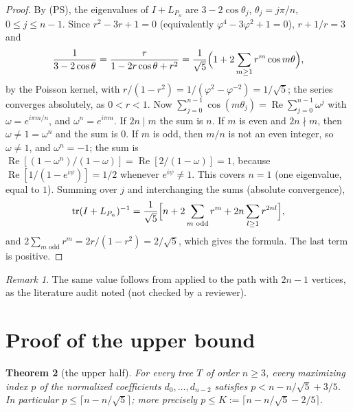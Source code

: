 \documentclass[11pt]{amsart}
\newtheorem{theorem}{Theorem}[section]
\theoremstyle{definition}
\theoremstyle{remark}
\newtheorem{remark}[theorem]{Remark}
\newcommand{\tr}{\operatorname{tr}}
\begin{document}
\begin{proof}
By (PS), the eigenvalues of $I+L_{P_n}$ are $3-2\cos\theta_j$,
$\theta_j=j\pi/n$, $0\le j\le n-1$. Since $r^2-3r+1=0$ (equivalently
$\varphi^4-3\varphi^2+1=0$), $r+1/r=3$ and
\[
\frac1{3-2\cos\theta}=\frac{r}{1-2r\cos\theta+r^2}
=\frac1{\sqrt5}\Bigl(1+2\sum_{m\ge1}r^m\cos m\theta\Bigr),
\]
by the Poisson kernel, with $r/(1-r^2)=1/(\varphi^2-\varphi^{-2})=1/\sqrt5$;
the series converges absolutely, as $0<r<1$. Now
$\sum_{j=0}^{n-1}\cos(m\theta_j)=\operatorname{Re}\sum_{j=0}^{n-1}\omega^j$ with
$\omega=e^{i\pi m/n}$, and $\omega^n=e^{i\pi m}$. If $2n\mid m$ the sum is $n$.
If $m$ is even and $2n\nmid m$, then $\omega\ne1=\omega^n$ and the sum is $0$.
If $m$ is odd, then $m/n$ is not an even integer, so $\omega\ne1$, and
$\omega^n=-1$; the sum is
$\operatorname{Re}[(1-\omega^n)/(1-\omega)]=\operatorname{Re}[2/(1-\omega)]=1$,
because $\operatorname{Re}[1/(1-e^{i\psi})]=1/2$ whenever $e^{i\psi}\ne1$.
This covers $n=1$ (one eigenvalue, equal to $1$). Summing over $j$ and
interchanging the sums (absolute convergence),
\[
\tr(I+L_{P_n})^{-1}=\frac1{\sqrt5}\Bigl[n+2\sum_{m\text{ odd}}r^m+2n\sum_{l\ge1}r^{2nl}\Bigr],
\]
and $2\sum_{m\text{ odd}}r^m=2r/(1-r^2)=2/\sqrt5$, which gives the formula.
The last term is positive.
\end{proof}

\begin{remark}
The same value follows from \cite[Lemma~4.2, eq.~(8)]{AMW} applied to the
path with $2n-1$ vertices, as the literature audit noted (not checked by a
reviewer).
\end{remark}

\section{Proof of the upper bound}\label{sec:proof}

\begin{theorem}[the upper half]\label{thm:upper}
For every tree $T$ of order $n\ge3$, every maximizing index $p$ of the
normalized coefficients $d_0,\dots,d_{n-2}$ satisfies $p<n-n/\sqrt5+3/5$. In
particular $p\le\lceil n-n/\sqrt5\rceil$; more precisely
$p\le K:=\lceil n-n/\sqrt5-2/5\rceil$.
\end{theorem}
\end{document}
